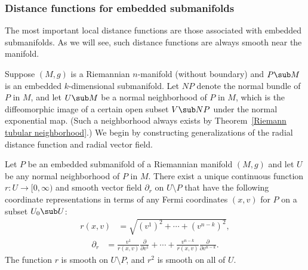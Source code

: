 \subsubsection{Distance functions for embedded submanifolds}
The most important local distance functions are those associated with embedded submanifolds. As we will see, such distance functions are always smooth near the manifold.\par
Suppose $(M,g)$ is a Riemannian $n$-manifold (without boundary) and $P\sub M$ is an embedded $k$-dimensional submanifold. Let $NP$ denote the normal bundle of $P$ in $M$, 
and let $U\sub M$ be a normal neighborhood of $P$ in $M$, which is the diffeomorphic image of a certain open subset $V\sub NP$ under the normal exponential map. (Such a 
neighborhood always exists by Theorem~\ref{Riemann tubular neighborhood}.) We begin by constructing generalizations of the radial distance function and radial vector 
field.
\begin{proposition}\label{Riemann distance subm}
Let $P$ be an embedded submanifold of a Riemannian manifold $(M,g)$ and let $U$ be any normal neighborhood of $P$ in $M$. There exist a unique continuous function $r:U\to[0,\infty)$ 
and smooth vector field $\partial_r$ on $U\setminus P$ that have the following coordinate representations in terms of any Fermi coordinates $(x,v)$ for $P$ on a subset $U_0\sub U$:
\begin{align}\label{Riemann distance subm-1}
r(x,v)&=\sqrt{(v^1)^2+\cdots+(v^{n-k})^2},
\end{align}
\begin{align}\label{Riemann distance subm-2}
\partial_r&=\frac{v^1}{r(x,v)}\frac{\partial}{\partial v^1}+\cdots+\frac{v^{n-k}}{r(x,v)}\frac{\partial}{\partial v^{n-k}}.
\end{align}
The function $r$ is smooth on $U\setminus P$, and $r^2$ is smooth on all of $U$.
\end{proposition}
